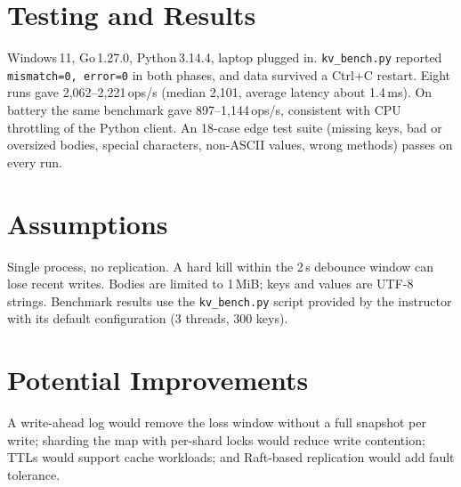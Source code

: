 \documentclass[10pt,letterpaper]{article}
\begin{document}
\section*{Testing and Results}
Windows\,11, Go\,1.27.0, Python\,3.14.4, laptop plugged in.
\texttt{kv\_bench.py} reported \texttt{mismatch=0, error=0} in both phases, and
data survived a Ctrl+C restart. Eight runs gave 2,062--2,221\,ops/s (median
2,101, average latency about 1.4\,ms). On battery the same benchmark gave
897--1,144\,ops/s, consistent with CPU throttling of the Python client. An
18-case edge test suite (missing keys, bad or oversized bodies, special
characters, non-ASCII values, wrong methods) passes on every run.

\section*{Assumptions}
Single process, no replication. A hard kill within the 2\,s debounce window can
lose recent writes. Bodies are limited to 1\,MiB; keys and values are UTF-8
strings. Benchmark results use the \texttt{kv\_bench.py} script provided by the
instructor with its default configuration (3 threads, 300 keys).

\section*{Potential Improvements}
A write-ahead log would remove the loss window without a full snapshot per
write; sharding the map with per-shard locks would reduce write contention;
TTLs would support cache workloads; and Raft-based replication would add fault
tolerance.
\end{document}
